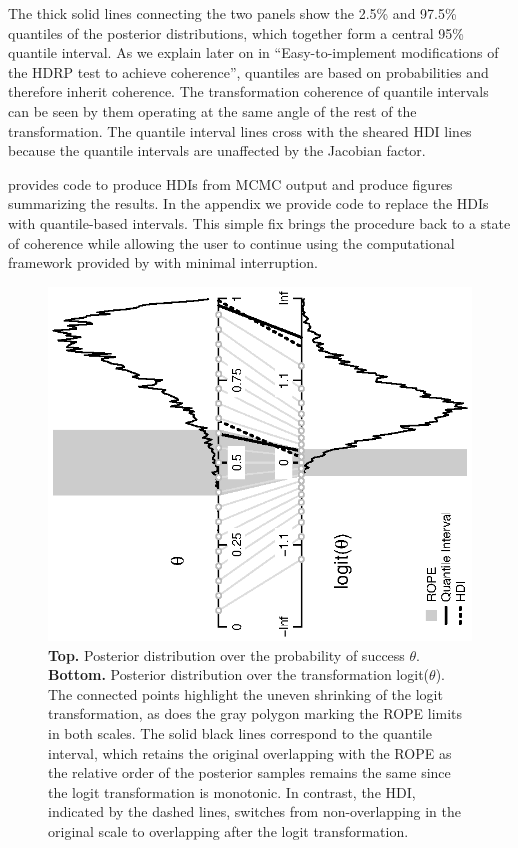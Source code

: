 \documentclass[man]{apa}
\newcommand{\hdr}{HDRP}
\begin{document}
The thick solid lines connecting the two panels show the 2.5\% and 97.5\% quantiles of the posterior distributions, which together form a central 95\% quantile interval. As we explain later on in ``Easy-to-implement modifications of the \hdr{} test to achieve coherence'', quantiles are based on probabilities and therefore inherit coherence. The transformation coherence of quantile intervals can be seen by them operating at the same angle of the rest of the transformation. The quantile interval lines cross with the sheared HDI lines because the quantile intervals are unaffected by the Jacobian factor.

 provides code to produce HDIs from MCMC output and produce figures summarizing the results. In the appendix we provide code to replace the HDIs with quantile-based intervals. This simple fix brings the procedure back to a state of coherence while allowing the user to continue using the computational framework provided by \cite{Kruschke2010Book} with minimal interruption.

\begin{figure}
    \includegraphics[angle=-90]{p/transformation.eps}
    \caption{\textbf{Top.} Posterior distribution over the probability of success $\theta$. \textbf{Bottom.} Posterior distribution over the transformation logit($\theta$). The connected points highlight the uneven shrinking of the logit transformation, as does the gray polygon marking the ROPE limits in both scales. The solid black lines correspond to the quantile interval, which retains the original overlapping with the ROPE as the relative order of the posterior samples remains the same since the logit transformation is monotonic. In contrast, the HDI, indicated by the dashed lines, switches from non-overlapping in the original scale to overlapping after the logit transformation.}
    \label{fig:transformation}
\end{figure}
\end{document}

